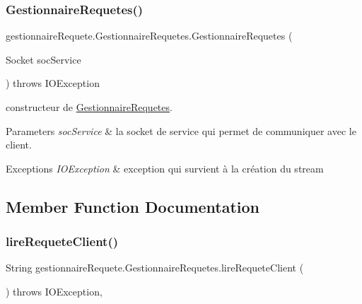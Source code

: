 \subsubsection{\texorpdfstring{Gestionnaire\+Requetes()}{GestionnaireRequetes()}}
{\footnotesize\ttfamily gestionnaire\+Requete.\+Gestionnaire\+Requetes.\+Gestionnaire\+Requetes (\begin{DoxyParamCaption}\item[{Socket}]{soc\+Service }\end{DoxyParamCaption}) throws I\+O\+Exception\hspace{0.3cm}{\ttfamily [inline]}}



constructeur de \hyperlink{classgestionnaireRequete_1_1GestionnaireRequetes}{Gestionnaire\+Requetes}. 


\begin{DoxyParams}{Parameters}
{\em soc\+Service} & la socket de service qui permet de communiquer avec le client. \\
\hline
\end{DoxyParams}

\begin{DoxyExceptions}{Exceptions}
{\em I\+O\+Exception} & exception qui survient à la création du stream \\
\hline
\end{DoxyExceptions}


\subsection{Member Function Documentation}
\mbox{\label{classgestionnaireRequete_1_1GestionnaireRequetes_a71eceb6b3b7236615f117e0ddf75896c}} 
\subsubsection{\texorpdfstring{lire\+Requete\+Client()}{lireRequeteClient()}}
{\footnotesize\ttfamily String gestionnaire\+Requete.\+Gestionnaire\+Requetes.\+lire\+Requete\+Client (\begin{DoxyParamCaption}{ }\end{DoxyParamCaption}) throws I\+O\+Exception\hspace{0.3cm}{\ttfamily [inline]}, {\ttfamily [protected]}}



